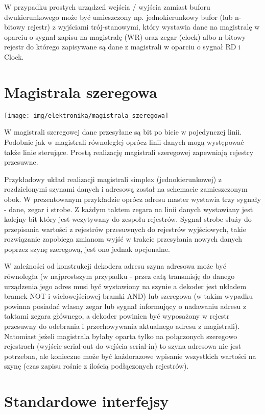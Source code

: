 \documentclass{pdfBooklets}
\begin{document}
W przypadku prostych urządzeń wejścia / wyjścia zamiast buforu dwukierunkowego może być umieszczony np.
jednokierunkowy bufor (lub n-bitowy rejestr) z wyjściami trój-stanowymi, który wystawia dane na magistralę w oparciu o sygnał zapisu na magistralę (WR) oraz zegar (clock) albo
n-bitowy rejestr do którego zapisywane są dane z magistrali w oparciu o sygnał RD i Clock.

\section{Magistrala szeregowa}

\begin{center}
    \texttt{[image: img/elektronika/magistrala\_szeregowa]}
\end{center}
W magistrali szeregowej dane przesyłane są bit po bicie w pojedynczej linii. Podobnie jak w magistrali równoległej oprócz linii danych mogą występować także linie sterujące. Prostą realizację magistrali szeregowej zapewniają rejestry przesuwne.

Przykładowy układ realizacji magistrali simplex (jednokierunkowej) z rozdzielonymi szynami danych i adresową został na schemacie zamieszczonym obok.
W prezentowanym przykładzie oprócz adresu master wystawia trzy sygnały - dane, zegar i strobe. Z każdym taktem zegara na linii danych wystawiany jest kolejny bit który jest wczytywany do zespołu rejestrów. Sygnał strobe służy do przepisania wartości z rejestrów przesuwnych do rejestrów wyjściowych, takie rozwiązanie zapobiega zmianom wyjść w trakcie przesyłania nowych danych poprzez szynę szeregową, jest ono jednak opcjonalne.

W zależności od konstrukcji dekodera adresu szyna adresowa może być równoległa (w najprostszym przypadku - przez całą transmisję do danego urządzenia jego adres musi być wystawiony na szynie a dekoder jest układem bramek NOT i wielowejściowej bramki AND) lub szeregowa (w takim wypadku powinna posiadać własny zegar lub sygnał informujący o nadawaniu adresu z taktami zegara głównego, a dekoder powinien być wyposażony w rejestr przesuwny do odebrania i przechowywania aktualnego adresu z magistrali). Natomiast jeżeli magistrala byłaby oparta tylko na połączonych szeregowo rejestrach (wyjście serial-out do wejścia serial-in) to szyna adresowa nie jest potrzebna, ale konieczne może być każdorazowe wpisanie wszystkich wartości na szynę (czas zapisu rośnie z ilością podłączonych rejestrów).

\section{Standardowe interfejsy}
\end{document}
